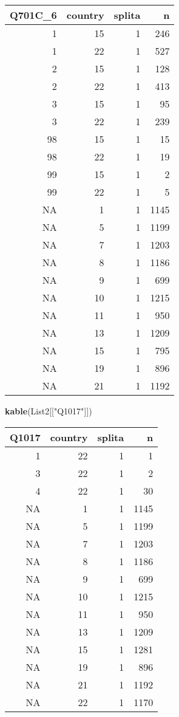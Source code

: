 \documentclass[]{article}
\newenvironment{Shaded}{\begin{snugshade}}{\end{snugshade}}
\newcommand{\KeywordTok}[1]{\textcolor[rgb]{0.13,0.29,0.53}{\textbf{#1}}}
\newcommand{\NormalTok}[1]{#1}
\newcommand{\StringTok}[1]{\textcolor[rgb]{0.31,0.60,0.02}{#1}}
\begin{document}
\begin{tabular}{r|r|r|r}
\hline
Q701C\_6 & country & splita & n\\
\hline
1 & 15 & 1 & 246\\
\hline
1 & 22 & 1 & 527\\
\hline
2 & 15 & 1 & 128\\
\hline
2 & 22 & 1 & 413\\
\hline
3 & 15 & 1 & 95\\
\hline
3 & 22 & 1 & 239\\
\hline
98 & 15 & 1 & 15\\
\hline
98 & 22 & 1 & 19\\
\hline
99 & 15 & 1 & 2\\
\hline
99 & 22 & 1 & 5\\
\hline
NA & 1 & 1 & 1145\\
\hline
NA & 5 & 1 & 1199\\
\hline
NA & 7 & 1 & 1203\\
\hline
NA & 8 & 1 & 1186\\
\hline
NA & 9 & 1 & 699\\
\hline
NA & 10 & 1 & 1215\\
\hline
NA & 11 & 1 & 950\\
\hline
NA & 13 & 1 & 1209\\
\hline
NA & 15 & 1 & 795\\
\hline
NA & 19 & 1 & 896\\
\hline
NA & 21 & 1 & 1192\\
\hline
\end{tabular}

\begin{Shaded}
\begin{Highlighting}[]
\KeywordTok{kable}\NormalTok{(List2[[}\StringTok{"Q1017"}\NormalTok{]])}
\end{Highlighting}
\end{Shaded}

\begin{tabular}{r|r|r|r}
\hline
Q1017 & country & splita & n\\
\hline
1 & 22 & 1 & 1\\
\hline
3 & 22 & 1 & 2\\
\hline
4 & 22 & 1 & 30\\
\hline
NA & 1 & 1 & 1145\\
\hline
NA & 5 & 1 & 1199\\
\hline
NA & 7 & 1 & 1203\\
\hline
NA & 8 & 1 & 1186\\
\hline
NA & 9 & 1 & 699\\
\hline
NA & 10 & 1 & 1215\\
\hline
NA & 11 & 1 & 950\\
\hline
NA & 13 & 1 & 1209\\
\hline
NA & 15 & 1 & 1281\\
\hline
NA & 19 & 1 & 896\\
\hline
NA & 21 & 1 & 1192\\
\hline
NA & 22 & 1 & 1170\\
\hline
\end{tabular}
\end{document}
